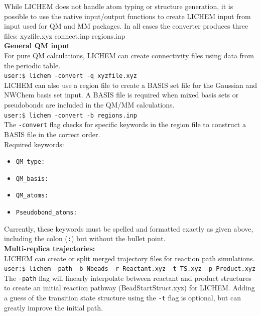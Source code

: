 \documentclass[12pt]{report}
\begin{document}
While LICHEM does not handle atom typing or structure generation, it is
possible to use the native input/output functions to create LICHEM input from
input used for QM and MM packages.
In all cases the converter produces three files: xyzfile.xyz connect.inp
regions.inp \\

{\textbf{General QM input}} \\

For pure QM calculations, LICHEM can create connectivity files using data
from the periodic table. \\

\texttt{user:\$ lichem -convert -q xyzfile.xyz} \\

LICHEM can also use a region file to create a BASIS set file for the Gaussian
and NWChem basis set input.
A BASIS file is required when mixed basis sets or pseudobonds are included
in the QM/MM calculations. \\

\texttt{user:\$ lichem -convert -b regions.inp} \\

The \texttt{-convert} flag checks for specific keywords in the region file to
construct a BASIS file in the correct order. \\

Required keywords:
\begin{itemize}
\item \texttt{QM\_type:}
\item \texttt{QM\_basis:}
\item \texttt{QM\_atoms:}
\item \texttt{Pseudobond\_atoms:}\\
\end{itemize}

Currently, these keywords must be spelled and formatted exactly as given
above, including the colon (\texttt{:}) but without the bullet point. \\

{\textbf{Multi-replica trajectories:}} \\

LICHEM can create or split merged trajectory files for reaction path
simulations. \\

\texttt{user:\$ lichem -path -b Nbeads -r Reactant.xyz -t TS.xyz -p Product.xyz} \\

The \texttt{-path} flag will linearly interpolate between reactant and product
structures to create an initial reaction pathway (BeadStartStruct.xyz) for
LICHEM.
Adding a guess of the transition state structure using the \texttt{-t} flag is
optional, but can greatly improve the initial path. \\
\end{document}
